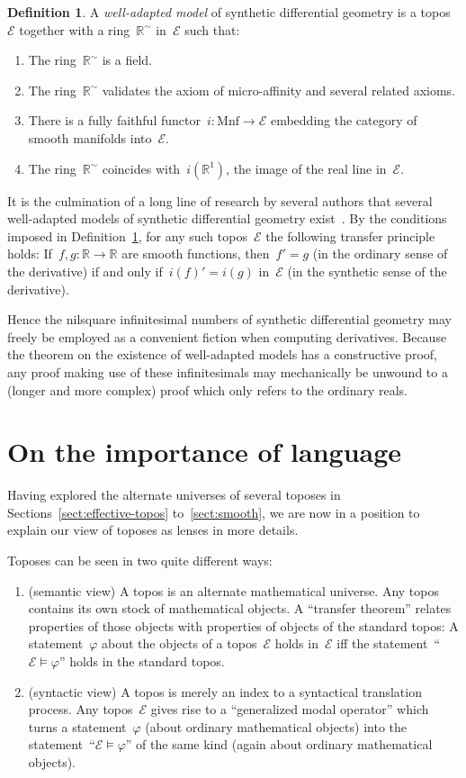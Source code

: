 \documentclass[oneside,reqno]{amsart}
\theoremstyle{definition}
\newtheorem{defn}{Definition}[section]
\theoremstyle{plain}
\theoremstyle{remark}
\newcommand{\E}{\mathcal{E}}
\newcommand{\RR}{\mathbb{R}}
\renewcommand{\_}{\mathpunct{.}\,}
\newcommand{\?}{\,{:}\,}
\begin{document}
\begin{defn}\label{defn:well-adapted}A \emph{well-adapted model} of synthetic
differential geometry is a topos~$\E$ together with a ring~$\RR^\sim$ in~$\E$ such
that:
\begin{enumerate}
\item The ring~$\RR^\sim$ is a field.
\item The ring~$\RR^\sim$ validates the axiom of micro-affinity and several related
axioms.
\item There is a fully faithful functor~$i : \mathrm{Mnf} \to \E$ embedding the
category of smooth manifolds into~$\E$.
\item The ring~$\RR^\sim$ coincides with~$i(\RR^1)$, the image of the real line
in~$\E$.
\end{enumerate}
\end{defn}

It is the culmination of a long line of research by several authors that
several well-adapted models of synthetic differential geometry exist~\cite{moerdijk-reyes:models}. By the
conditions imposed in Definition~\ref{defn:well-adapted}, for any such
topos~$\E$ the following transfer principle holds: If~$f,g : \RR \to \RR$ are
smooth functions, then~$f' = g$ (in the ordinary sense of the derivative) if
and only if~$i(f)' = i(g)$ in~$\E$ (in the synthetic sense of the derivative).

Hence the nilsquare infinitesimal numbers of synthetic differential geometry
may freely be employed as a convenient fiction when computing derivatives.
Because the theorem on the existence of well-adapted models has a constructive
proof, any proof making use of these infinitesimals may mechanically be
unwound to a (longer and more complex) proof which only refers to the ordinary
reals.


\section{On the importance of language}

Having explored the alternate universes of several toposes in
Sections~\ref{sect:effective-topos} to~\ref{sect:smooth}, we are now in a
position to explain our view of toposes as lenses in more details.

Toposes can be seen in two quite different ways:
\begin{enumerate}
\item (semantic view) A topos is an alternate mathematical universe. Any topos
contains its own stock of mathematical objects. A ``transfer theorem'' relates
properties of those objects with properties of objects of the standard topos: A
statement~$\varphi$ about the objects of a topos~$\E$ holds in~$\E$ iff the
statement~``$\E \models \varphi$'' holds in the standard topos.
\item (syntactic view) A topos is merely an index to a syntactical translation
process. Any topos~$\E$ gives rise to a ``generalized modal operator'' which
turns a statement~$\varphi$ (about ordinary mathematical objects) into the
statement~``$\E \models \varphi$'' of the same kind (again about ordinary
mathematical objects).
\end{enumerate}
\end{document}
